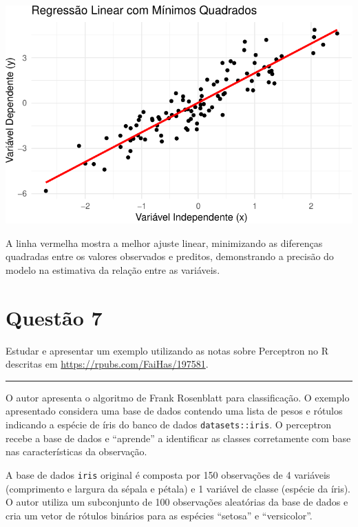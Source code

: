 \documentclass[
  a4paperpaper,
]{article}
\begin{document}
\includegraphics{lista-3_files/figure-pdf/unnamed-chunk-8-1.pdf}

A linha vermelha mostra a melhor ajuste linear, minimizando as
diferenças quadradas entre os valores observados e preditos,
demonstrando a precisão do modelo na estimativa da relação entre as
variáveis.

\newpage{}

\section{Questão 7}\label{questuxe3o-7}

Estudar e apresentar um exemplo utilizando as notas sobre Perceptron no
R descritas em \url{https://rpubs.com/FaiHas/197581}.

\begin{center}\rule{0.5\linewidth}{0.5pt}\end{center}

O autor apresenta o algoritmo de Frank Rosenblatt para classificação. O
exemplo apresentado considera uma base de dados contendo uma lista de
pesos e rótulos indicando a espécie de íris do banco de dados
\texttt{datasets::iris}. O perceptron recebe a base de dados e
``aprende'' a identificar as classes corretamente com base nas
características da observação.

A base de dados \texttt{iris} original é composta por 150 observações de
4 variáveis (comprimento e largura da sépala e pétala) e 1 variável de
classe (espécie da íris). O autor utiliza um subconjunto de 100
observações aleatórias da base de dados e cria um vetor de rótulos
binários para as espécies ``setosa'' e ``versicolor''.

~
\end{document}
